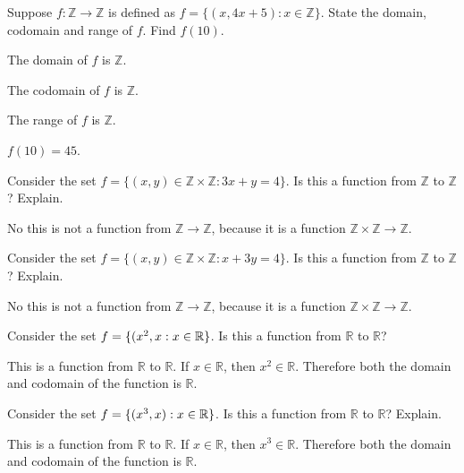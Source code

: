 \documentclass[openany, 12pt]{book}
\begin{document}
\begin{exercise}{}{}
	Suppose $f: \mathbb{Z} \rightarrow \mathbb{Z}$ is defined
	as $f=\{(x, 4 x+5): x \in \mathbb{Z}\}$. State the domain, codomain and
	range of $f$. Find $f(10)$.
	\tcblower
	\begin{alist}
		\item The domain of $f$ is $\mathbb{Z}$.
		\item The codomain of $f$ is $\mathbb{Z}$.
		\item The range of $f$ is $\mathbb{Z}$.
		\item $f(10)=45$.
	\end{alist}
\end{exercise}

\begin{exercise}{}{}
	Consider the set $f=\{(x, y) \in \mathbb{Z} \times \mathbb{Z}: 3 x+y=4\}$.
	Is this a function from $\mathbb{Z}$ to $\mathbb{Z}$? Explain.
	\tcblower
	\begin{alist}
		\item No this is not a function from $\mathbb{Z}\rightarrow\mathbb{Z}$, because
		it is a function $\mathbb{Z}\times\mathbb{Z}\rightarrow\mathbb{Z}$.
	\end{alist}
\end{exercise}

\begin{exercise}{}{}
	Consider the set $f=\{(x, y) \in \mathbb{Z} \times \mathbb{Z}: x+3 y=4\}$.
	Is this a function from $\mathbb{Z}$ to $\mathbb{Z}$? Explain.
	\tcblower
	\begin{alist}
		\item No this is not a function from $\mathbb{Z}\rightarrow\mathbb{Z}$, because
		it is a function $\mathbb{Z}\times\mathbb{Z}\rightarrow\mathbb{Z}$.
	\end{alist}
\end{exercise}

\begin{exercise}{}{}
	Consider the set $f=\{(x^2, x: x \in \mathbb{R}\}$. Is this a function from $\mathbb{R}$ to $\mathbb{R}$?
	\tcblower
	\begin{alist}
		\item This is a function from $\mathbb{R}$ to $\mathbb{R}$. If $x\in
			\mathbb{R}$, then $x^2 \in \mathbb{R}$. Therefore both the domain
		and codomain of the function is $\mathbb{R}$.
	\end{alist}
\end{exercise}

\begin{exercise}{}{}
	Consider the set $f=\{(x^3, x): x \in \mathbb{R}\}$. Is this a function from $\mathbb{R}$ to $\mathbb{R}$? Explain.
	\tcblower
	\begin{alist}
		\item This is a function from $\mathbb{R}$ to $\mathbb{R}$. If $x\in
			\mathbb{R}$, then $x^3 \in \mathbb{R}$. Therefore both the domain
		and codomain of the function is $\mathbb{R}$.
	\end{alist}
\end{exercise}
\end{document}
